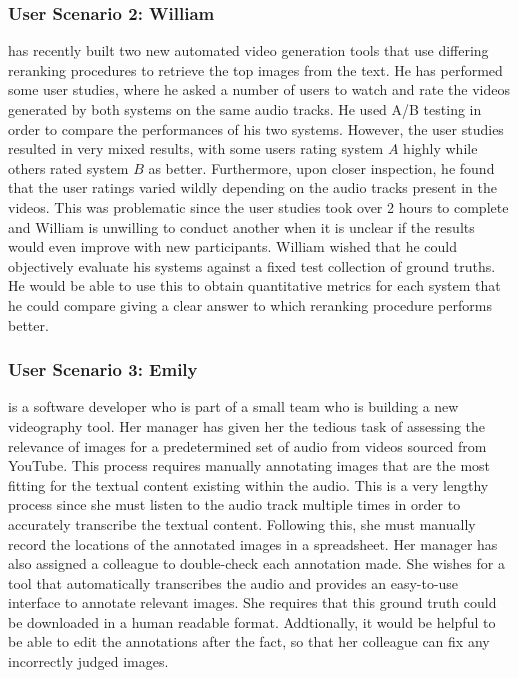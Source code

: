 \documentclass{l4proj}
\begin{document}
\subsubsection{User Scenario 2: William} has recently built two new automated video generation tools that use differing reranking procedures to retrieve the top images from the text. He has performed some user studies, where he asked a number of users to watch and rate the videos generated by both systems on the same audio tracks. He used A/B testing in order to compare the performances of his two systems. However, the user studies resulted in very mixed results, with some users rating system $A$ highly while others rated system $B$ as better. Furthermore, upon closer inspection, he found that the user ratings varied wildly depending on the audio tracks present in the videos. This was problematic since the user studies took over 2 hours to complete and William is unwilling to conduct another when it is unclear if the results would even improve with new participants. William wished that he could objectively evaluate his systems against a fixed test collection of ground truths. He would be able to use this to obtain quantitative metrics for each system that he could compare giving a clear answer to which reranking procedure performs better.

\subsubsection{User Scenario 3: Emily} is a software developer who is part of a small team who is building a new videography tool. Her manager has given her the tedious task of assessing the relevance of images for a predetermined set of audio from videos sourced from YouTube. This process requires manually annotating images that are the most fitting for the textual content existing within the audio. This is a very lengthy process since she must listen to the audio track multiple times in order to accurately transcribe the textual content. Following this, she must manually record the locations of the annotated images in a spreadsheet. Her manager has also assigned a colleague to double-check each annotation made. She wishes for a tool that automatically transcribes the audio and provides an easy-to-use interface to annotate relevant images. She requires that this ground truth could be downloaded in a human readable format. Addtionally, it would be helpful to be able to edit the annotations after the fact, so that her colleague can fix any incorrectly judged images.
\end{document}
